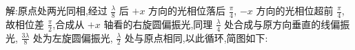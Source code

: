     解:原点处两光同相,经过 $\frac{\lambda}{8}$ 后 $+x$ 方向的光相位落后 $\frac{\pi}{4}$, $-x$ 方向的光相位超前 $\frac{\pi}{4}$,故相位差 $\frac{\pi}{2}$,合成从 $+x$ 轴看的右旋圆偏振光,同理 $\frac{\lambda}{4}$ 处合成与原方向垂直的线偏振光, $\frac{3\lambda}{8}$ 处为左旋圆偏振光, $\frac{\lambda}{2}$ 处与原点相同,以此循环,简图如下:
    \begin{figure}[htbp]
        \centering
    \end{figure}

